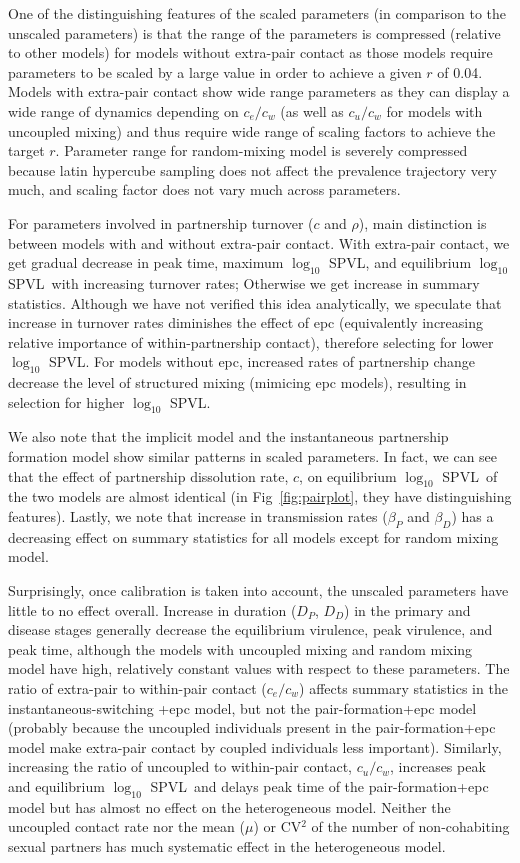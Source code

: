 \documentclass[10pt,letterpaper]{article}
\renewcommand{\figurename}{Fig}
\newcommand{\Lspvl}{$\log_{10}$ SPVL}
\begin{document}
One of the distinguishing features of the scaled parameters (in comparison to the unscaled parameters) is that the range of the parameters is compressed (relative to other models) for models without extra-pair contact as those models require parameters to be scaled by a large value in order to achieve a given $r$ of 0.04.
Models with extra-pair contact show wide range parameters as they can display a wide range of dynamics depending on $c_e/c_w$ (as well as $c_u/c_w$ for models with uncoupled mixing) and thus require wide range of scaling factors to achieve the target $r$.
Parameter range for random-mixing model is severely compressed because latin hypercube sampling does not affect the prevalence trajectory very much, and scaling factor does not vary much across parameters.

For parameters involved in partnership turnover ($c$ and $\rho$), main distinction is between models with and without extra-pair contact. With extra-pair contact, we get gradual decrease in peak time, maximum \Lspvl, and equilibrium \Lspvl\ with increasing turnover rates; Otherwise we get increase in summary statistics.
Although we have not verified this idea analytically, we speculate that increase in turnover rates diminishes the effect of epc (equivalently increasing relative importance of within-partnership contact), therefore selecting for lower \Lspvl.
For models without epc, increased rates of partnership change decrease the level of structured mixing (mimicing epc models), resulting in selection for higher \Lspvl.

We also note that the implicit model and the instantaneous partnership formation model show similar patterns in scaled parameters. In fact, we can see that the effect of partnership dissolution rate, $c$, on equilibrium \Lspvl\ of the two models are almost identical (in \figurename~\ref{fig:pairplot}, they have distinguishing features).
Lastly, we note that increase in transmission rates ($\beta_P$ and $\beta_D$) has a decreasing effect on summary statistics for all models except for random mixing model.

Surprisingly, once calibration
is taken into account, the unscaled parameters have little to no effect overall.
Increase in duration ($D_P$, $D_D$) in the primary and disease stages generally decrease the equilibrium virulence, peak virulence, and peak time,
although the models with uncoupled mixing and random mixing model have high, relatively
constant values with respect to these parameters.
The ratio of extra-pair to within-pair contact ($c_e/c_w$) affects
summary statistics in the instantaneous-switching +epc model, but not the pair-formation+epc
model (probably because the uncoupled individuals present in the pair-formation+epc
model make extra-pair contact by coupled individuals less important).
Similarly, increasing the ratio of uncoupled to within-pair contact, $c_u/c_w$, increases peak and equilibrium \Lspvl\ and delays peak time of the pair-formation+epc model but has almost no effect on the heterogeneous model.
Neither the uncoupled contact rate nor
the mean ($\mu$) or CV$^2$ of the number of non-cohabiting sexual
partners has much systematic effect in the heterogeneous model.
\end{document}
